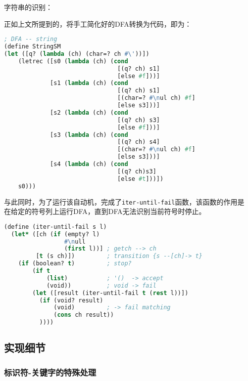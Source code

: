 \documentclass[lang=cn]{elegantpaper}
\begin{document}
\begin{example} 字符串的识别：

    正如上文所提到的，将手工简化好的DFA转换为代码，即为：

    \begin{lstlisting}[language=lisp,caption=Racket-lang 实现-用于匹配字符串的DFA定义]
; DFA -- string
(define StringSM
(let ([q? (lambda (ch) (char=? ch #\'))])
    (letrec ([s0 (lambda (ch) (cond
                                [(q? ch) s1]
                                [else #f]))]
             [s1 (lambda (ch) (cond
                                [(q? ch) s1]
                                [(char=? #\nul ch) #f]
                                [else s3]))]
             [s2 (lambda (ch) (cond
                                [(q? ch) s3]
                                [else #f]))]
             [s3 (lambda (ch) (cond
                                [(q? ch) s4]
                                [(char=? #\nul ch) #f]
                                [else s3]))]
             [s4 (lambda (ch) (cond
                                [(q? ch)s3]
                                [else #t]))])
    s0)))
    \end{lstlisting}

    与此同时，为了运行该自动机，完成了\lstinline|iter-until-fail|函数，该函数的作用是
    在给定的符号列上运行DFA，直到DFA无法识别当前符号时停止。

    \begin{lstlisting}[language=lisp, caption=在给定的符号列上，运行该状态机]
(define (iter-until-fail s l)
  (let* ([ch (if (empty? l)
                 #\null
                 (first l))] ; getch --> ch
         [t (s ch)])         ; transition {s --[ch]-> t}
    (if (boolean? t)         ; stop?
        (if t
            (list)           ; '()  -> accept
            (void))          ; void -> fail
        (let ([result (iter-until-fail t (rest l))])
          (if (void? result)
              (void)         ; -> fail matching
              (cons ch result))
          ))))
    \end{lstlisting}
\end{example}

\subsection{实现细节}

\subsubsection{标识符-关键字的特殊处理}
\end{document}

